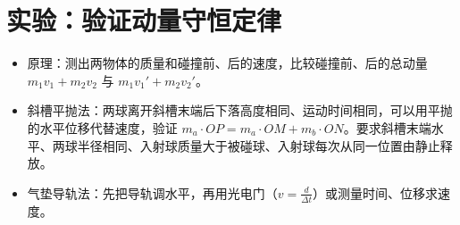 \documentclass[\gkver]{gaokaozhenti}
\begin{document}
\section{实验：验证动量守恒定律}
\begin{yaodian}
\begin{itemize}
\item 原理：测出两物体的质量和碰撞前、后的速度，比较碰撞前、后的总动量 $m_{1}v_{1}+m_{2}v_{2}$ 与 $m_{1}v_{1}'+m_{2}v_{2}'$。
\item 斜槽平抛法：两球离开斜槽末端后下落高度相同、运动时间相同，可以用平抛的水平位移代替速度，验证 $m_{a}\cdot OP=m_{a}\cdot OM+m_{b}\cdot ON$。要求斜槽末端水平、两球半径相同、入射球质量大于被碰球、入射球每次从同一位置由静止释放。
\item 气垫导轨法：先把导轨调水平，再用光电门（$v=\frac{d}{\Delta t}$）或测量时间、位移求速度。
\end{itemize}
\end{yaodian}
\end{document}
